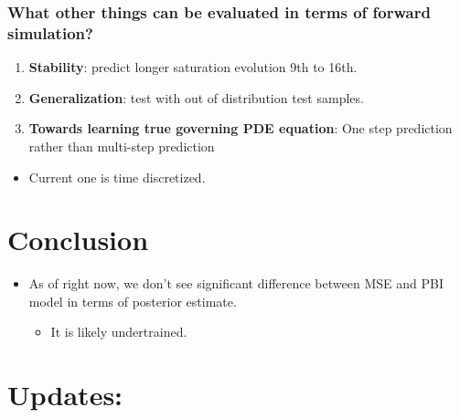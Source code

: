 \documentclass[
]{article}
\providecommand{\tightlist}{%
  \setlength{\itemsep}{0pt}\setlength{\parskip}{0pt}}\usepackage{longtable,booktabs,array}
\begin{document}
\subsubsection{What other things can be evaluated in terms of forward
simulation?}\label{what-other-things-can-be-evaluated-in-terms-of-forward-simulation}

\begin{enumerate}
\def\labelenumi{\arabic{enumi}.}
\tightlist
\item
  \textbf{Stability}: predict longer saturation evolution 9th to 16th.
\item
  \textbf{Generalization}: test with out of distribution test samples.
\item
  \textbf{Towards learning true governing PDE equation}: One step
  prediction rather than multi-step prediction
\end{enumerate}

\begin{itemize}
\tightlist
\item
  Current one is time discretized.
\end{itemize}

\section{Conclusion}\label{conclusion}

\begin{itemize}
\tightlist
\item
  As of right now, we don't see significant difference between MSE and
  PBI model in terms of posterior estimate.

  \begin{itemize}
  \tightlist
  \item
    It is likely undertrained.
  \end{itemize}
\end{itemize}

\section{Updates:}\label{updates}
\end{document}

